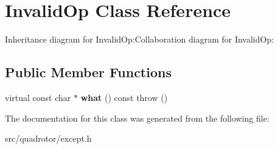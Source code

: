 \hypertarget{classInvalidOp}{
\section{InvalidOp Class Reference}
\label{classInvalidOp}
}
Inheritance diagram for InvalidOp:Collaboration diagram for InvalidOp:\subsection*{Public Member Functions}
\begin{DoxyCompactItemize}
\item 
\hypertarget{classInvalidOp_ad89cda4b62702beb435e982f0c8b9e42}{
virtual const char $\ast$ {\bfseries what} () const   throw ()}
\label{classInvalidOp_ad89cda4b62702beb435e982f0c8b9e42}

\end{DoxyCompactItemize}


The documentation for this class was generated from the following file:\begin{DoxyCompactItemize}
\item 
src/quadrotor/except.h\end{DoxyCompactItemize}
